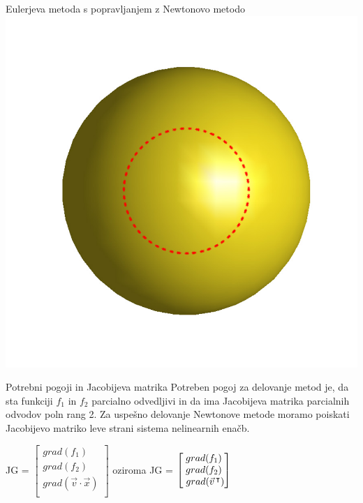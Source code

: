 \documentclass{beamer}
\begin{document}
\begin{frame}{Eulerjeva metoda s popravljanjem z Newtonovo metodo}
	\includegraphics[scale=0.2]{eul3_newt}
	
\end{frame}

\begin{frame}{Potrebni pogoji in Jacobijeva matrika}
	Potreben pogoj za delovanje metod je, da sta funkciji $f_{1}$ in $f_{2}$ parcialno odvedljivi in da ima Jacobijeva matrika parcialnih odvodov poln rang 2. Za uspešno delovanje Newtonove metode moramo poiskati Jacobijevo matriko leve strani sistema nelinearnih enačb.
	
	\begin{center}
		JG = $\begin{bmatrix}
		grad(f_{1}) \\
		grad(f_{2}) \\
		grad(\vec{v} \cdot \vec{x}) \\
		\end{bmatrix}$
		oziroma
		JG = $\begin{bmatrix}
		grad(f_{1}) \\
		grad(f_{2}) \\
		\hspace{1mm}grad(\vec{v}\hspace{0.5mm}^\intercal) \\
		\end{bmatrix}$
	\end{center}
\end{frame}
\end{document}
